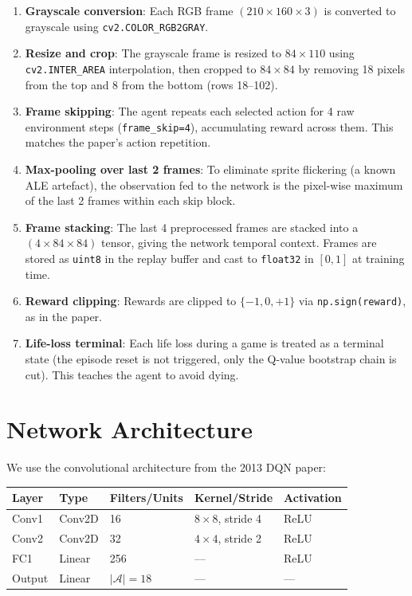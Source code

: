 \documentclass[11pt,a4paper]{article}
\begin{document}
\begin{enumerate}
  \item \textbf{Grayscale conversion}: Each RGB frame $(210 \times 160 \times 3)$ is
        converted to grayscale using \texttt{cv2.COLOR\_RGB2GRAY}.

  \item \textbf{Resize and crop}: The grayscale frame is resized to $84 \times 110$
        using \texttt{cv2.INTER\_AREA} interpolation, then cropped to $84 \times 84$
        by removing 18 pixels from the top and 8 from the bottom (rows 18--102).

  \item \textbf{Frame skipping}: The agent repeats each selected action for 4 raw
        environment steps (\texttt{frame\_skip=4}), accumulating reward across them.
        This matches the paper's action repetition.

  \item \textbf{Max-pooling over last 2 frames}: To eliminate sprite flickering
        (a known ALE artefact), the observation fed to the network is the pixel-wise
        maximum of the last 2 frames within each skip block.

  \item \textbf{Frame stacking}: The last 4 preprocessed frames are stacked into a
        $(4 \times 84 \times 84)$ tensor, giving the network temporal context.
        Frames are stored as \texttt{uint8} in the replay buffer and cast to
        \texttt{float32} in $[0,1]$ at training time.

  \item \textbf{Reward clipping}: Rewards are clipped to $\{-1, 0, +1\}$ via
        \texttt{np.sign(reward)}, as in the paper.

  \item \textbf{Life-loss terminal}: Each life loss during a game is treated as a
        terminal state (the episode reset is not triggered, only the Q-value bootstrap
        chain is cut). This teaches the agent to avoid dying.
\end{enumerate}

\section{Network Architecture}

We use the convolutional architecture from the 2013 DQN paper:

\begin{center}
\begin{tabular}{lllll}
\toprule
\textbf{Layer} & \textbf{Type} & \textbf{Filters/Units} & \textbf{Kernel/Stride} & \textbf{Activation} \\
\midrule
Conv1 & Conv2D & 16 & $8\times8$, stride 4 & ReLU \\
Conv2 & Conv2D & 32 & $4\times4$, stride 2 & ReLU \\
FC1   & Linear & 256 & — & ReLU \\
Output & Linear & $|\mathcal{A}|=18$ & — & — \\
\bottomrule
\end{tabular}
\end{center}
\end{document}
